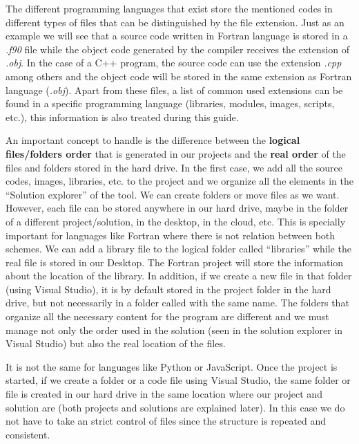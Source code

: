 The different programming languages that exist store the mentioned codes in different types of files that can be distinguished by the file extension. Just as an example we will see that a source code written in Fortran language is stored in a \textit{.f90} file while the object code generated by the compiler receives the extension of \textit{.obj}. In the case of a C++ program, the source code can use the extension \textit{.cpp} among others and the object code will be stored in the same extension as Fortran language (\textit{.obj}). Apart from these files, a list of common used extensions can be found in a specific programming language (libraries, modules, images, scripts, etc.), this information is also treated during this guide.

An important concept to handle is the difference between the \textbf{logical files/folders order} that is generated in our projects and the \textbf{real order} of the files and folders stored in the hard drive. In the first case, we add all the source codes, images, libraries, etc. to the project and we organize all the elements in the ``Solution explorer'' of the tool. We can create folders or move files as we want. However, each file can be stored anywhere in our hard drive, maybe in the folder of a different project/solution, in the desktop, in the cloud, etc. This is specially important for languages like Fortran where there is not relation between both schemes. We can add a library file to the logical folder called ``libraries'' while the real file is stored in our Desktop. The Fortran project will store the information about the location of the library. In addition, if we create a new file in that folder (using Visual Studio), it is by default stored in the project folder in the hard drive, but not necessarily in a folder called with the same name. The folders that organize all the necessary content for the program are different and we must manage not only the order used in the solution (seen in the solution explorer in Visual Studio) but also the real location of the files. %

It is not the same for languages like Python or JavaScript. Once the project is started, if we create a folder or a code file using Visual Studio, the same folder or file is created in our hard drive in the same location where our project and solution are (both projects and solutions are explained later). In this case we do not have to take an strict control of files since the structure is repeated and consistent. 


